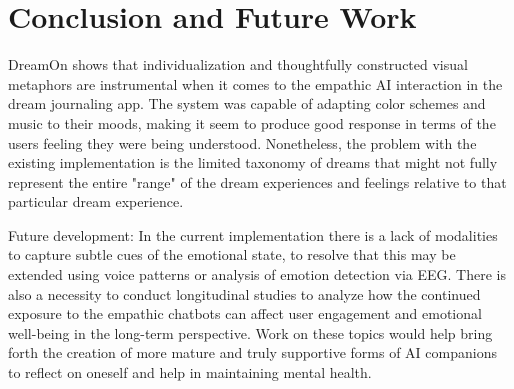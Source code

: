 \documentclass[conference]{IEEEtran}
\begin{document}
\section{Conclusion and Future Work}
DreamOn shows that individualization and thoughtfully constructed visual metaphors are instrumental when it comes to the empathic AI interaction in the dream journaling app. The system was capable of adapting color schemes and music to their moods, making it seem to produce good response in terms of the users feeling they were being understood. Nonetheless, the problem with the existing implementation is the limited taxonomy of dreams that might not fully represent the entire "range" of the dream experiences and feelings relative to that particular dream experience.

Future development: In the current implementation there is a lack of modalities to capture subtle cues of the emotional state, to resolve that this may be extended using voice patterns or analysis of emotion detection via EEG. There is also a necessity to conduct longitudinal studies to analyze how the continued exposure to the empathic chatbots can affect user engagement and emotional well-being in the long-term perspective. Work on these topics would help bring forth the creation of more mature and truly supportive forms of AI companions to reflect on oneself and help in maintaining mental health.
	
\end{document}
